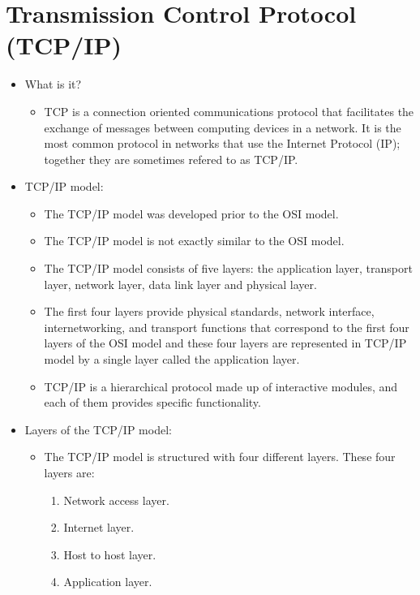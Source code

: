 \section{Transmission Control Protocol (TCP/IP)}
\begin{itemize}
    \item What is it?
        \begin{itemize}
            \item TCP is a connection oriented communications protocol that facilitates the exchange of messages between computing devices in a network. It is the most common protocol in networks that use the Internet Protocol (IP); together they are sometimes refered to as TCP/IP.
        \end{itemize}
    
    \item TCP/IP model:
        \begin{itemize}
            \item The TCP/IP model was developed prior to the OSI model.
            \item The TCP/IP model is not exactly similar to the OSI model.
            \item The TCP/IP model consists of five layers: the application layer, transport layer, network layer, data link layer and physical layer.
            \item The first four layers provide physical standards, network interface, internetworking, and transport functions that correspond to the first four layers of the OSI model and these four layers are represented in TCP/IP model by a single layer called the application layer.
            \item TCP/IP is a hierarchical protocol made up of interactive modules, and each of them provides specific functionality.
        \end{itemize}
    
    \item Layers of the TCP/IP model:
        \begin{itemize}
            \item The TCP/IP model is structured with four different layers. These four layers are: 
                \begin{enumerate}
                    \item Network access layer.
                    \item Internet layer.
                    \item Host to host layer.
                    \item Application layer.
                \end{enumerate}
        \end{itemize}
    

\end{itemize}
